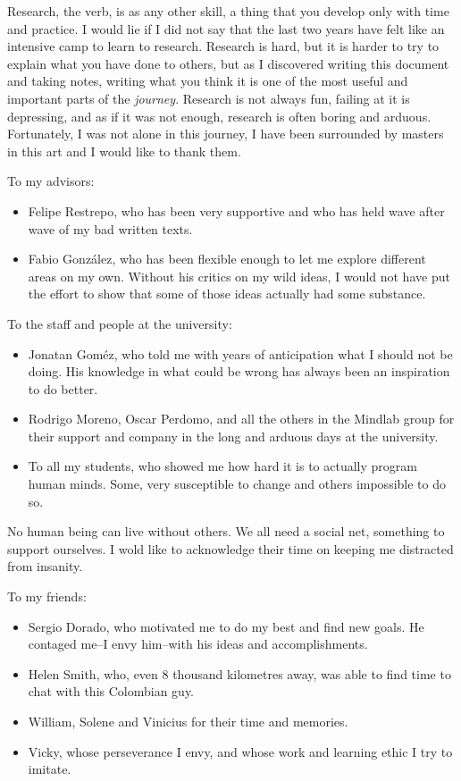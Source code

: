 Research, the verb, is as any other skill, a thing that you develop only with time and
practice. I would lie if I did not say that the last two years have felt like an intensive
camp to learn to research. Research is hard, but it is harder to try to explain what you
have done to others, but as I discovered writing this document and taking notes, writing
what you think it is one of the most useful and important parts of the \textit{journey}.
Research is not always fun, failing at it is depressing, and as if it was not enough,
research is often boring and arduous. Fortunately, I was not alone in this journey, I have
been surrounded by masters in this art and I would like to thank them.

To my advisors:

\begin{itemize}
\tightlist
\item Felipe Restrepo, who has been very supportive and who has held wave after wave of my
  bad written texts.
\item Fabio González, who has been flexible enough to let me explore different areas on my
  own. Without his critics on my wild ideas, I would not have put the effort to show that
  some of those ideas actually had some substance.
\end{itemize}

To the staff and people at the university:

\begin{itemize}
\tightlist
\item Jonatan Goméz, who told me with years of anticipation what I should not be doing.
  His knowledge in what could be wrong has always been an inspiration to do better.
\item Rodrigo Moreno, Oscar Perdomo, and all the others in the Mindlab group for their
  support and company in the long and arduous days at the university.
\item To all my students, who showed me how hard it is to actually program human minds.
  Some, very susceptible to change and others impossible to do so.
\end{itemize}

No human being can live without others. We all need a social net, something to support
ourselves. I wold like to acknowledge their time on keeping me distracted from insanity.

To my friends:

\begin{itemize}
\tightlist
\item Sergio Dorado, who motivated me to do my best and find new goals. He contaged me--I
  envy him--with his ideas and accomplishments.
\item Helen Smith, who, even 8 thousand kilometres away, was able to find time to chat
  with this Colombian guy.
\item William, Solene and Vinicius for their time and memories.
\item Vicky, whose perseverance I envy, and whose work and learning ethic I try to imitate.
\end{itemize}

